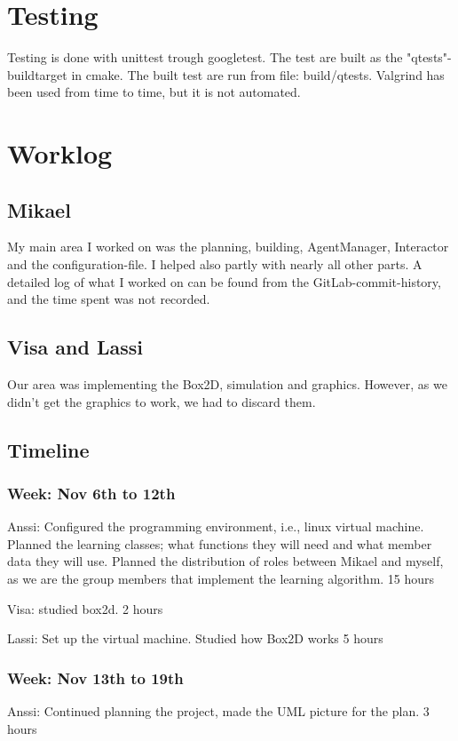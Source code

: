 \documentclass{article}
\begin{document}
\section{Testing}
Testing is done with unittest trough googletest.
The test are built as the "qtests"-buildtarget in cmake.
The built test are run from file: build/qtests.
Valgrind has been used from time to time, but it is not automated.


\section{Worklog}

\subsection{Mikael}
My main area I worked on was the planning, building, AgentManager,
Interactor and the configuration-file. I helped also partly with nearly all
other parts.
A detailed log of what I worked on can be found from the GitLab-commit-history,
and the time spent was not recorded.


\subsection{Visa and Lassi}
Our area was implementing the Box2D, simulation and graphics. However, as we didn't
get the graphics to work, we had to discard them.

\subsection{Timeline}

\subsubsection{Week: Nov 6th to 12th}
Anssi:
Configured the programming environment, i.e., linux virtual machine.
Planned the learning classes; what functions they will need and what
member data they will use. Planned the distribution of roles between
Mikael and myself, as we are the group members that implement the learning
algorithm.
15 hours

Visa: 
studied box2d.
2 hours

Lassi:
Set up the virtual machine. Studied how Box2D works
5 hours

\subsubsection{Week: Nov 13th to 19th}
Anssi:
Continued planning the project, made the UML picture for the plan.
3 hours
\end{document}
